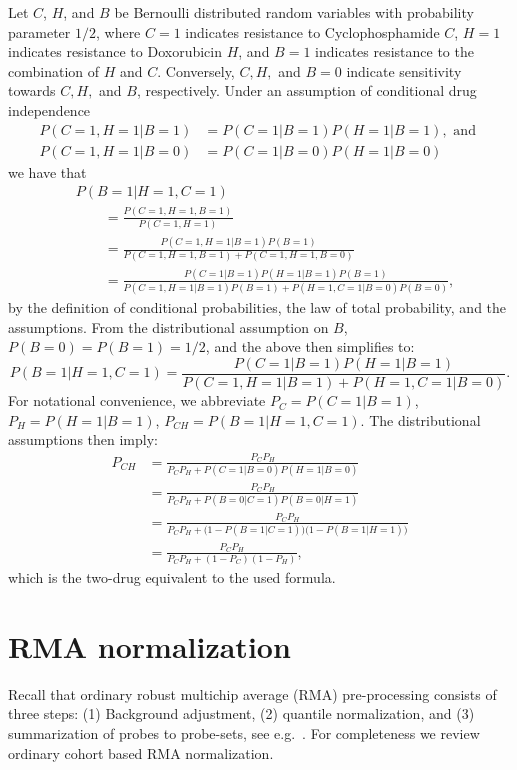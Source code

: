 Let $C$, $H$, and $B$ be Bernoulli distributed random variables with probability parameter $1/2$, where
$C = 1$ indicates resistance to Cyclophosphamide $C$,
$H = 1$ indicates resistance to Doxorubicin $H$, and
$B = 1$ indicates resistance to the combination of $H$ and $C$.
Conversely, $C,H,$ and $B = 0$ indicate sensitivity towards $C,H,$ and $B$, respectively.
Under an assumption of conditional drug independence
\begin{align*}
  P(C=1, H=1| B=1) &= P(C=1 | B=1) P(H=1 | B=1), \text{ and } \\
  P(C=1, H=1| B=0) &= P(C=1 | B=0) P(H=1 | B=0)
\end{align*}
we have that
\begin{align*}
  &P(B=1 | H=1, C=1)
  \\&\qquad
   = \frac{P(C=1, H=1, B=1)}
          {P(C=1, H=1)}
  \\&\qquad
   = \frac{P(C=1, H=1 | B=1) P(B=1)}
          {P(C=1, H=1, B=1) + P(C=1, H=1, B=0)}
  \\&\qquad
   = \frac{P(C=1 | B=1) P(H=1 | B=1) P(B=1)}
          {P(C=1, H=1 | B=1) P(B=1) + P(H=1, C=1| B=0) P(B=0)},
\end{align*}
by the definition of conditional probabilities, the law of total probability, and the assumptions.
From the distributional assumption on $B$, $P(B=0) = P(B=1) = 1/2$, and the above then simplifies to:
\begin{equation*}
  P(B=1 | H=1, C=1)
   = \frac{P(C=1 | B=1) P(H=1 | B=1)}
          {P(C=1, H=1 | B=1) + P(H=1, C=1 | B=0)}.
\end{equation*}
For notational convenience, we abbreviate
$P_C = P(C=1 | B=1)$,
$P_H = P(H=1 | B=1)$,
$P_{CH} = P(B=1 | H=1, C=1)$.
The distributional assumptions then imply:
\begin{align*}
  P_{CH}
  &= \frac{P_C P_H}
          {P_C P_H + P(C=1 | B=0) P(H=1 | B=0)}
  \\
  &= \frac{P_C P_H}
          {P_C P_H + P(B=0 | C=1) P(B=0 | H=1)}
  \\
  &= \frac{P_C P_H}
          {P_C P_H + \bigl(1 - P(B=1 | C=1)\bigr)\bigl(1 - P(B=1 | H=1)\bigr)}
  \\
  &= \frac{P_C P_H}
          {P_C P_H + (1 - P_C)(1 - P_H)},
\end{align*}
which is the two-drug equivalent to the used formula.




\section{RMA normalization}
Recall that ordinary robust multichip average (RMA) pre-processing consists of three steps: (1) Background adjustment, (2) quantile normalization, and (3) summarization of probes to probe-sets, see e.g.\ \citep{Irizarry2003, Irizarry2003b}. For completeness we review ordinary cohort based RMA normalization.

